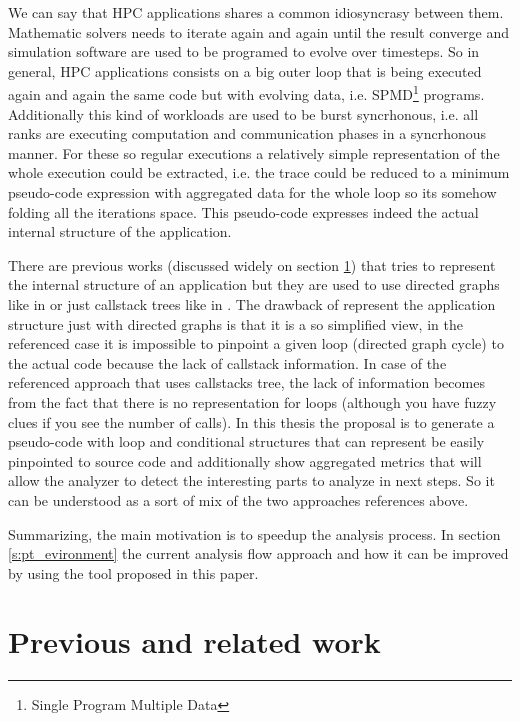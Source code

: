 \documentclass[12pt]{report}
\begin{document}
We can say that HPC applications shares a common idiosyncrasy between them. 
Mathematic solvers needs to iterate again and again until the result converge and 
simulation software are used to be programed to evolve over timesteps. So in 
general, HPC applications consists on a big outer loop that is being executed 
again and again the same code but with evolving data, i.e. SPMD\footnote{Single
Program Multiple Data} programs. Additionally this kind of workloads are used
to be burst syncrhonous, i.e. all ranks are executing computation and
communication phases in a syncrhonous manner. For these so regular executions a
relatively simple representation of the whole execution could be extracted, i.e.
the trace could be reduced to a minimum pseudo-code expression
with aggregated data for the whole loop so its somehow folding all the iterations
space. This pseudo-code expresses indeed the actual internal structure of the 
application.

There are previous works (discussed widely on section \ref{related_work})  that 
tries to represent the internal structure of an application but they are used to
use directed graphs like in \cite{aguilar2016event} or just callstack trees like
in \cite{saviankou2015cube}. The drawback of represent the application structure
just with directed graphs is that it is a so simplified view, in the referenced
case it is impossible to pinpoint a given loop (directed graph cycle) to the
actual code because the lack of callstack information. In case of the
referenced approach that uses callstacks tree, the lack of information becomes
from the fact that there is no representation for loops (although you have fuzzy
clues if you see the number of calls). In this thesis the proposal is to 
generate a pseudo-code with loop and conditional structures that can represent
be easily pinpointed to source code and additionally show aggregated metrics
that will allow the analyzer to detect the interesting parts to analyze in next
steps. So it can be understood as a sort of mix of the two approaches references
above.

Summarizing, the main motivation is to speedup the analysis process. In section
\ref{s:pt_evironment} the current analysis flow approach and how it can be
improved by using the tool proposed in this paper.

\section{Previous and related work}\label{related_work}
\end{document}
